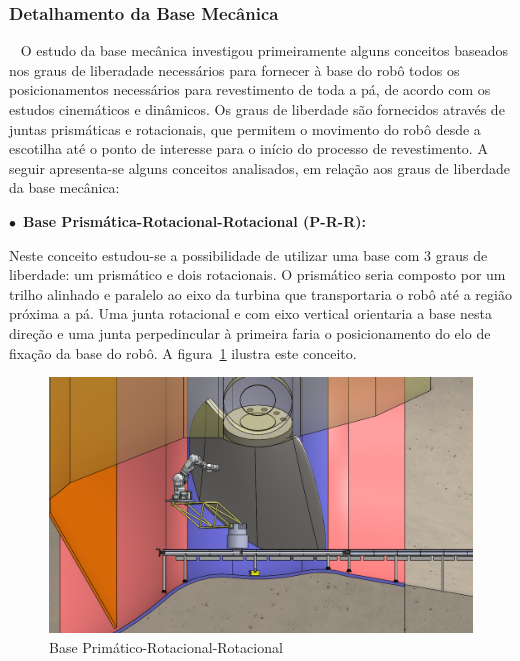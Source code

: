 \subsubsection{Detalhamento da Base Mecânica}~\label{sec::base_mec}%
O estudo da base mecânica investigou primeiramente alguns conceitos baseados nos
graus de liberadade necessários para fornecer à base do robô todos os
posicionamentos necessários para revestimento de toda a pá, de acordo com os
estudos cinemáticos e dinâmicos. Os graus de liberdade são fornecidos através de
juntas prismáticas e rotacionais, que permitem o movimento do robô desde a
escotilha até o ponto de interesse para o início do processo de revestimento. A
seguir apresenta-se alguns conceitos analisados, em relação aos graus de
liberdade da base mecânica:

$\bullet$~\textbf{Base Prismática-Rotacional-Rotacional (P-R-R):}
  
  Neste conceito estudou-se a possibilidade de utilizar uma base com $3$ graus
  de liberdade: um prismático e dois rotacionais. O prismático seria composto
  por um trilho alinhado e paralelo ao eixo da turbina que transportaria o robô
  até a região próxima a pá. Uma junta rotacional e com eixo vertical orientaria
  a base nesta direção e uma junta perpedincular à primeira faria o
  posicionamento do elo de fixação da base do robô. A figura~\ref{fig::base_prr}
  ilustra este conceito.
    
  \begin{figure}[h!]
   \centering
   \includegraphics[width=0.8\columnwidth]{figs/bases/base_prr}
   \caption{Base Primático-Rotacional-Rotacional}
   \label{fig::base_prr}
\end{figure}

